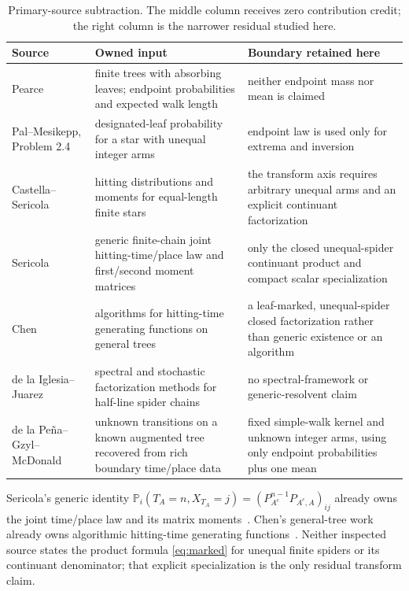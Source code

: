 \documentclass[a4paper,10pt]{amsart}
\theoremstyle{remark}
\newcommand{\Prob}{\mathbb P}
\begin{document}
\begin{table}[ht]
\centering
\small
\caption{Primary-source subtraction.  The middle column receives zero
contribution credit; the right column is the narrower residual studied here.}
\label{tab:subtraction}
\begin{tabular}{@{}>{\raggedright\arraybackslash}p{}
                    >{\raggedright\arraybackslash}p{}
                    >{\raggedright\arraybackslash}p{}@{}}
\toprule
Source & Owned input & Boundary retained here \\
\midrule
Pearce~\cite{Pearce1980} & finite trees with absorbing leaves; endpoint
probabilities and expected walk length & neither endpoint mass nor mean is
claimed \\
Pal--Mesikepp, Problem 2.4~\cite{PalMesikepp2025} & designated-leaf
probability for a star with unequal integer arms & endpoint law is used only
for extrema and inversion \\
Castella--Sericola~\cite{CastellaSericola2026} & hitting distributions and
moments for equal-length finite stars & the transform axis requires arbitrary
unequal arms and an explicit continuant factorization \\
Sericola~\cite{Sericola2024} & generic finite-chain joint hitting-time/place
law and first/second moment matrices & only the closed unequal-spider
continuant product and compact scalar specialization \\
Chen~\cite{Chen2007} & algorithms for hitting-time generating functions on
general trees & a leaf-marked, unequal-spider closed factorization rather
than generic existence or an algorithm \\
de la Iglesia--Juarez~\cite{DelaIglesiaJuarez2023} & spectral and stochastic
factorization methods for half-line spider chains & no spectral-framework or
generic-resolvent claim \\
de la Pe{\~n}a--Gzyl--McDonald~\cite{DelaPenaGzylMcDonald2008} & unknown
transitions on a known augmented tree recovered from rich boundary time/place
data & fixed simple-walk kernel and unknown integer arms, using only endpoint
probabilities plus one mean \\
\bottomrule
\end{tabular}
\end{table}

Sericola's generic identity
$\Prob_i(T_A=n,X_{T_A}=j)=(P_{A^c}^{n-1}P_{A^c,A})_{ij}$ already owns the
joint time/place law and its matrix moments~\cite{Sericola2024}.  Chen's
general-tree work already owns algorithmic hitting-time generating
functions~\cite{Chen2007}.  Neither inspected source states the product
formula \eqref{eq:marked} for unequal finite spiders or its continuant
denominator; that explicit specialization is the only residual transform
claim.
\end{document}
